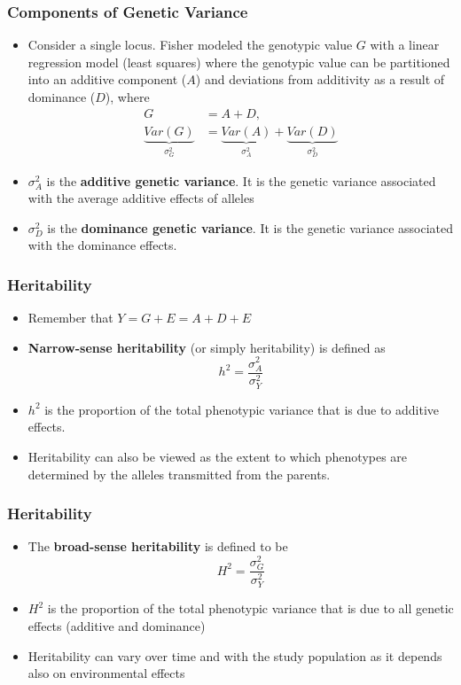 \documentclass{beamer}
\begin{document}
\begin{frame}
	\frametitle{\bf Components of Genetic Variance }
	\begin{itemize}
		\item Consider a single locus.  Fisher modeled the genotypic value $G$ with a linear regression model (least squares) where the genotypic value can be partitioned into an additive component ($A$) and deviations from additivity as a result of dominance ($D$), where 
		\vspace{-1em}
		\begin{align*}
		G &=A+ D ,\\
		\underbrace{Var(G)}_{\sigma^2_{G}}&= \underbrace{Var(A)}_{\sigma^2_{A}}+ \underbrace{Var(D)}_{\sigma^2_{D}} 
		\end{align*}
		\vspace{-0.5em}
		\item $\sigma^2_{A}$ is the \textbf{additive genetic variance}.  It is the genetic variance associated with the average additive effects of alleles
		\item  $\sigma^2_{D}$ is the \textbf{dominance genetic variance}. It is the genetic variance associated with the dominance effects.
		
		
	\end{itemize}
	
\end{frame}


\begin{frame}
	\frametitle{\bf Heritability}
	\begin{itemize}
		\item Remember that $Y=G+E = A+D+E$ 
		\item {\bf Narrow-sense heritability} (or simply heritability) is defined as
		\[ h^2 = \frac{    \sigma^2_{A} }    {  \sigma^2_{Y}   } \]
	\item   $h^2$ is the proportion of the total phenotypic variance that is due to additive effects. 
		\item Heritability can also be viewed as  the extent to which phenotypes are determined by the alleles transmitted from the parents.   
	\end{itemize}
\end{frame}


\begin{frame}
	\frametitle{\bf Heritability}
	\begin{itemize}
		\item The {\bf broad-sense heritability} is defined to be
		\[ H^2 = \frac{    \sigma^2_{G} }    {  \sigma^2_{Y}   } \]
		\item $H^2$  is the proportion of the total phenotypic variance that is due to all genetic effects (additive and dominance)
		\item Heritability can vary over time and with  the study population as it depends also on environmental effects
	\end{itemize}
\end{frame}
\end{document}
